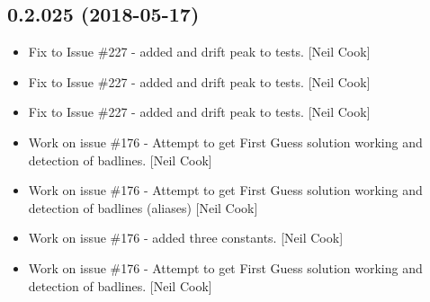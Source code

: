\documentclass[a4paper,10pt,english]{report}
\begin{document}
\subsection{0.2.025 (2018-05-17)}
\label{\detokenize{misc/changelog:id436}}\begin{itemize}
\item {} 
Fix to Issue \#227 - added  and drift peak to tests. {[}Neil
Cook{]}

\item {} 
Fix to Issue \#227 - added  and drift peak to tests. {[}Neil
Cook{]}

\item {} 
Fix to Issue \#227 - added  and drift peak to tests. {[}Neil
Cook{]}

\item {} 
Work on issue \#176 - Attempt to get First Guess solution working and
detection of badlines. {[}Neil Cook{]}

\item {} 
Work on issue \#176 - Attempt to get First Guess solution working and
detection of badlines (aliases) {[}Neil Cook{]}

\item {} 
Work on issue \#176 - added three  constants. {[}Neil Cook{]}

\item {} 
Work on issue \#176 - Attempt to get First Guess solution working and
detection of badlines. {[}Neil Cook{]}

\end{itemize}
\end{document}
